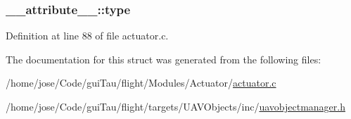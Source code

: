 \hypertarget{struct____attribute_____a30e60959661cf2e3b2dcc52e5d3e9249}{
\subsubsection[{type}]{ \-\_\-\-\_\-attribute\-\_\-\-\_\-\-::type}}\label{struct____attribute_____a30e60959661cf2e3b2dcc52e5d3e9249}


Definition at line 88 of file actuator.\-c.



The documentation for this struct was generated from the following files\-:\begin{DoxyCompactItemize}
\item 
/home/jose/\-Code/gui\-Tau/flight/\-Modules/\-Actuator/\hyperlink{actuator_8c}{actuator.\-c}\item 
/home/jose/\-Code/gui\-Tau/flight/targets/\-U\-A\-V\-Objects/inc/\hyperlink{targets_2_u_a_v_objects_2inc_2uavobjectmanager_8h}{uavobjectmanager.\-h}\end{DoxyCompactItemize}
